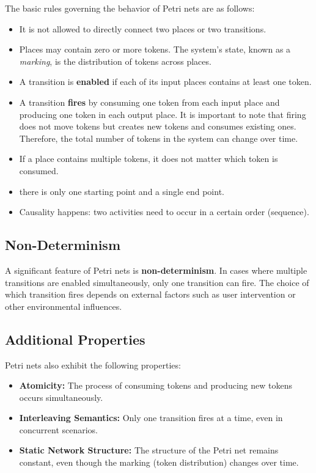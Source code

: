     The basic rules governing the behavior of Petri nets are as follows:
    \begin{itemize}
        \item It is not allowed to directly connect two places or two transitions.
        \item Places may contain zero or more tokens. The system's state, known as a \textit{marking}, is the distribution of tokens across places.
        \item A transition is \textbf{enabled} if each of its input places contains at least one token.
        \item A transition \textbf{fires} by consuming one token from each input place and producing one token in each output place. It is important to note that firing does not move tokens but creates new tokens and consumes existing ones. Therefore, the total number of tokens in the system can change over time.
        \item If a place contains multiple tokens, it does not matter which token is consumed.
        \item there is only one starting point and a single end point.
        \item Causality happens: two activities need to occur in a certain order (sequence).
    \end{itemize}
    
    \subsection{Non-Determinism}
    
    A significant feature of Petri nets is \textbf{non-determinism}. In cases where multiple transitions are enabled simultaneously, only one transition can fire. The choice of which transition fires depends on external factors such as user intervention or other environmental influences.
    
    \subsection{Additional Properties}
    
    Petri nets also exhibit the following properties:
    \begin{itemize}
        \item \textbf{Atomicity:} The process of consuming tokens and producing new tokens occurs simultaneously.
        \item \textbf{Interleaving Semantics:} Only one transition fires at a time, even in concurrent scenarios.
        \item \textbf{Static Network Structure:} The structure of the Petri net remains constant, even though the marking (token distribution) changes over time.
    \end{itemize}
    
